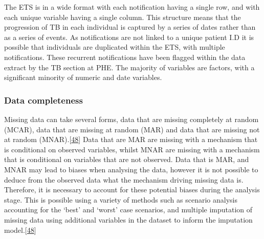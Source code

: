 \documentclass[11pt,twoside]{bristolthesis}
\begin{document}
  The ETS is in a wide format with each notification having a single row, and with each unique variable having a single column. This structure means that the progression of TB in each individual is captured by a series of dates rather than as a series of events. As notifications are not linked to a unique patient I.D it is possible that individuals are duplicated within the ETS, with multiple notifications. These recurrent notifications have been flagged within the data extract by the TB section at PHE. The majority of variables are factors, with a significant minority of numeric and date variables.
  
  \hypertarget{data-completeness}{%
  \subsubsection{Data completeness}\label{data-completeness}}
  
  Missing data can take several forms, data that are missing completely at random (MCAR), data that are missing at random (MAR) and data that are missing not at random (MNAR).{[}\protect\hyperlink{ref-Sterne2009a}{48}{]} Data that are MAR are missing with a mechanism that is conditional on observed variables, whilst MNAR are missing with a mechanism that is conditional on variables that are not observed. Data that is MAR, and MNAR may lead to biases when analysing the data, however it is not possible to deduce from the observed data what the mechanism driving missing data is. Therefore, it is necessary to account for these potential biases during the analysis stage. This is possible using a variety of methods such as scenario analysis accounting for the `best' and `worst' case scenarios, and multiple imputation of missing data using additional variables in the dataset to inform the imputation model.{[}\protect\hyperlink{ref-Sterne2009a}{48}{]}
  
\end{document}
